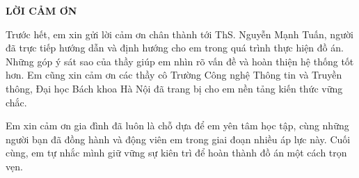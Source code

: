 \documentclass[../DoAn.tex]{subfiles}
\begin{document}
\begin{center}
    \Large{\textbf{LỜI CẢM ƠN}}\\
\end{center}
\vspace{1cm}
Trước hết, em xin gửi lời cảm ơn chân thành tới ThS. Nguyễn Mạnh Tuấn, người đã trực tiếp hướng dẫn và định hướng cho em trong quá trình thực hiện đồ án. Những góp ý sát sao của thầy giúp em nhìn rõ vấn đề và hoàn thiện hệ thống tốt hơn. Em cũng xin cảm ơn các thầy cô Trường Công nghệ Thông tin và Truyền thông, Đại học Bách khoa Hà Nội đã trang bị cho em nền tảng kiến thức vững chắc.

Em xin cảm ơn gia đình đã luôn là chỗ dựa để em yên tâm học tập, cùng những người bạn đã đồng hành và động viên em trong giai đoạn nhiều áp lực này. Cuối cùng, em tự nhắc mình giữ vững sự kiên trì để hoàn thành đồ án một cách trọn vẹn.
\end{document}
